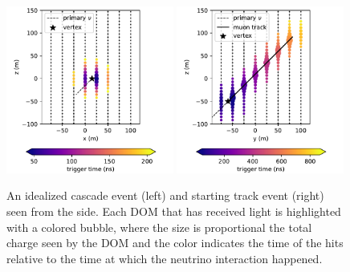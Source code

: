 \begin{figure}
    \centering
    \includegraphics[width=0.49\textwidth]{figures/icecube/eventviews/idealized_cascade_view.pdf}
    \hfill
    \includegraphics[width=0.49\textwidth]{figures/icecube/eventviews/idealized_track_view.pdf}
    \caption{An idealized cascade event (left) and starting track event (right) seen from the side. Each DOM that has received light is highlighted with a colored bubble, where the size is proportional the total charge seen by the DOM and the color indicates the time of the hits relative to the time at which the neutrino interaction happened.}
    \label{fig:idealized_signatures}
\end{figure}

